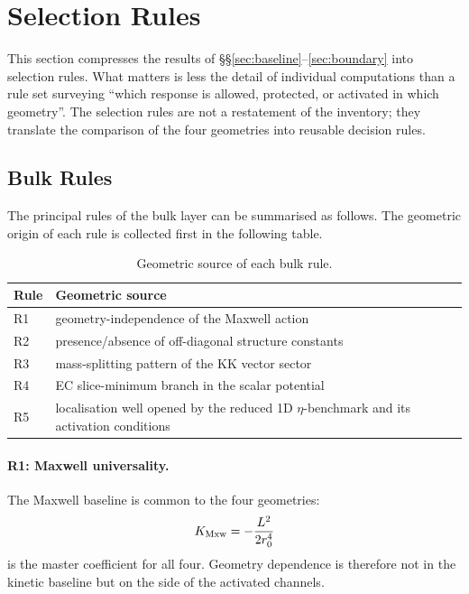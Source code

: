 \section{Selection Rules}
\label{sec:rules}

This section compresses the results of \S\S\ref{sec:baseline}--\ref{sec:boundary}
into selection rules.  What matters is less the detail of individual
computations than a rule set surveying ``which response is allowed,
protected, or activated in which geometry''.  The selection rules are not a
restatement of the inventory; they translate the comparison of the four
geometries into reusable decision rules.

\subsection{Bulk Rules}
\label{sec:rules:bulk}

The principal rules of the bulk layer can be summarised as follows.  The
geometric origin of each rule is collected first in the following table.

\begin{table}[H]
\centering
\begin{tabular}{ll}
\toprule
Rule & Geometric source \\
\midrule
R1 & geometry-independence of the Maxwell action \\
R2 & presence/absence of off-diagonal structure constants \\
R3 & mass-splitting pattern of the KK vector sector \\
R4 & EC slice-minimum branch in the scalar potential \\
R5 & localisation well opened by the reduced 1D $\eta$-benchmark and its activation conditions \\
\bottomrule
\end{tabular}
\caption{Geometric source of each bulk rule.}
\label{tab:bulk_rules_source}
\end{table}

\paragraph{R1: Maxwell universality.}
The Maxwell baseline is common to the four geometries:
\begin{equation}
  K_{\mathrm{Mxw}} = -\frac{L^2}{2r_0^4}
\end{equation}
is the master coefficient for all four.  Geometry dependence is therefore
not in the kinetic baseline but on the side of the activated channels.

